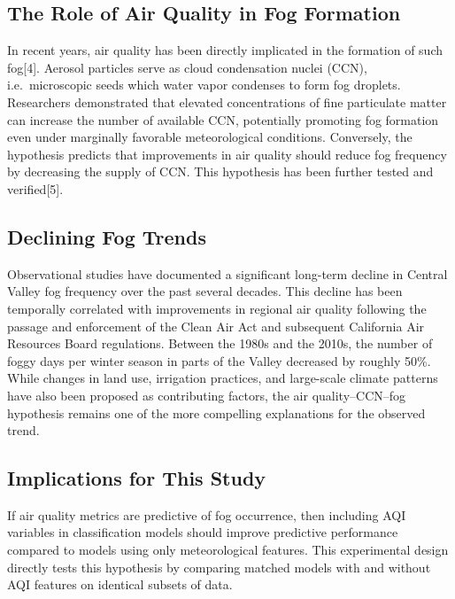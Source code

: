 \documentclass[
  letterpaper,
  DIV=11,
  numbers=noendperiod]{scrartcl}
\begin{document}
\subsection{The Role of Air Quality in Fog
Formation}\label{the-role-of-air-quality-in-fog-formation}

In recent years, air quality has been directly implicated in the
formation of such fog{[}4{]}. Aerosol particles serve as cloud
condensation nuclei (CCN), i.e.~microscopic seeds which water vapor
condenses to form fog droplets. Researchers demonstrated that elevated
concentrations of fine particulate matter can increase the number of
available CCN, potentially promoting fog formation even under marginally
favorable meteorological conditions. Conversely, the hypothesis predicts
that improvements in air quality should reduce fog frequency by
decreasing the supply of CCN. This hypothesis has been further tested
and verified{[}5{]}.

\subsection{Declining Fog Trends}\label{declining-fog-trends}

Observational studies have documented a significant long-term decline in
Central Valley fog frequency over the past several decades. This decline
has been temporally correlated with improvements in regional air quality
following the passage and enforcement of the Clean Air Act and
subsequent California Air Resources Board regulations. Between the 1980s
and the 2010s, the number of foggy days per winter season in parts of
the Valley decreased by roughly 50\%. While changes in land use,
irrigation practices, and large-scale climate patterns have also been
proposed as contributing factors, the air quality--CCN--fog hypothesis
remains one of the more compelling explanations for the observed trend.

\subsection{Implications for This
Study}\label{implications-for-this-study}

If air quality metrics are predictive of fog occurrence, then including
AQI variables in classification models should improve predictive
performance compared to models using only meteorological features. This
experimental design directly tests this hypothesis by comparing matched
models with and without AQI features on identical subsets of data.
\end{document}
